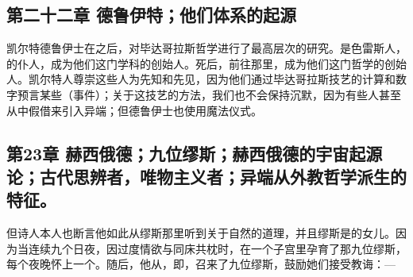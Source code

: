 
\subsection{第二十二章 德鲁伊特；他们体系的起源}

凯尔特德鲁伊士在之后，对毕达哥拉斯哲学进行了最高层次的研究。是色雷斯人，的仆人，成为他们这门学科的创始人。死后，前往那里，成为他们这门哲学的创始人。凯尔特人尊崇这些人为先知和先见，因为他们通过毕达哥拉斯技艺的计算和数字预言某些（事件）；关于这技艺的方法，我们也不会保持沉默，因为有些人甚至从中假借来引入异端；但德鲁伊士也使用魔法仪式。\par


\subsection{第23章 赫西俄德；九位缪斯；赫西俄德的宇宙起源论；古代思辨者，唯物主义者；异端从外教哲学派生的特征。}

但诗人本人也断言他如此从缪斯那里听到关于自然的道理，并且缪斯是的女儿。因为当连续九个日夜，因过度情欲与同床共枕时，在一个子宫里孕育了那九位缪斯，每个夜晚怀上一个。随后，他从，即，召来了九位缪斯，鼓励她们接受教诲：—\par

